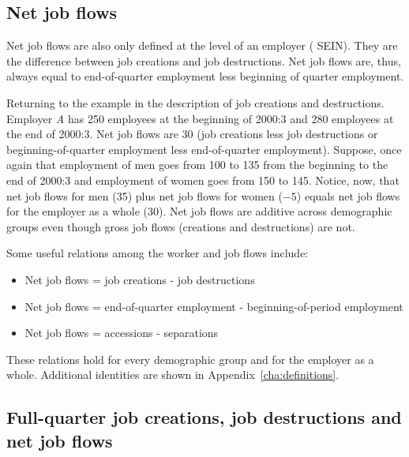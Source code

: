 \subsection{Net job flows}


Net job flows are also only defined at the level of an employer (%
SEIN). They are the difference between job creations and job
destructions. Net job flows are, thus, always equal to end-of-quarter
employment less beginning of quarter employment.

Returning to the example in the description of job creations and
destructions. Employer \textit{A} has 250 employees at the beginning of
2000:3 and 280 employees at the end of 2000:3. Net job flows are 30 (job
creations less job destructions or beginning-of-quarter employment less
end-of-quarter employment). Suppose, once again that employment of men goes
from 100 to 135 from the beginning to the end of 2000:3 and employment of
women goes from 150 to 145. Notice, now, that net job flows for men (35)
plus net job flows for women ($-5$) equals net job flows for the employer as
a whole (30). Net job flows are additive across demographic groups even
though gross job flows (creations and destructions) are not.

Some useful relations among the worker and job flows include:

\begin{itemize}
\item Net job flows = job creations - job destructions 
%
%

\item Net job flows = end-of-quarter employment - beginning-of-period
employment 
%

\item Net job flows = accessions - separations 
\end{itemize}

These relations hold for every demographic group and for the employer as a
whole. Additional identities are shown in Appendix~\ref{cha:definitions}.

\subsection{Full-quarter job creations, job destructions and net job flows}


